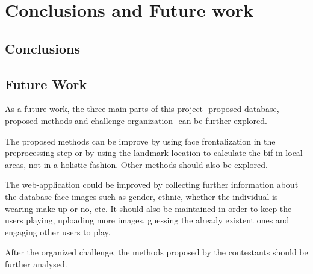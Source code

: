 \chapter{Conclusions and Future work} \label{chap:conclusions}

\section{Conclusions}



\section{Future Work}

As a future work, the three main parts of this project -proposed database, proposed methods and challenge organization- can be further explored.

The proposed methods can be improve by using face frontalization in the preprocessing step or by using the landmark location to calculate the \gls{bif} in local areas, not in a holistic fashion. Other methods should also be explored.

The web-application could be improved by collecting further information about the database face images such as gender, ethnic, whether the individual is wearing make-up or no, etc. It should also be maintained in order to keep the users playing, uploading more images, guessing the already existent ones and engaging other users to play.

After the organized challenge, the methods proposed by the contestants should be further analysed.
